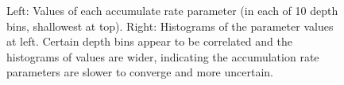 \begin{figure}[ht]
\centering
{}
\caption[]{Left: Values of each accumulate rate parameter (in each of 10 depth bins, shallowest at top). Right: Histograms of the parameter values at left. Certain depth bins appear to be correlated and the histograms of values are wider, indicating the accumulation rate parameters are slower to converge and more uncertain.}
\label{fig:accumconvergence}
\end{figure}

